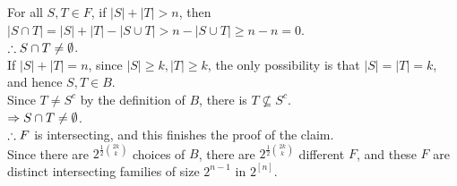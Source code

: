 \begin{pr}
\begin{enumerate}[(a)]
For all $S, T\in F$, if $|S|+|T|>n$, then $|S\cap T|=|S|+|T|-|S\cup T|>n-|S\cup T|\geq n-n=0$.\\
$\therefore S\cap T\neq\emptyset$.\\
If $|S|+|T|=n$, since $|S|\geq k, |T|\geq k$, the only possibility is that $|S|=|T|=k$, and hence $S, T\in B$.\\
Since $T\neq S^c$ by the definition of $B$, there is $T\not\subseteq S^c$.\\
$\Rightarrow S\cap T\neq\emptyset$.\\
$\therefore F$ is intersecting, and this finishes the proof of the claim.\\
Since there are $2^{\frac12\binom{2k}k}$ choices of $B$, there are $2^{\frac12\binom{2k}k}$ different $F$, and these $F$ are distinct intersecting families of size $2^{n-1}$ in $2^{[n]}$.
\end{enumerate}
\end{pr}
